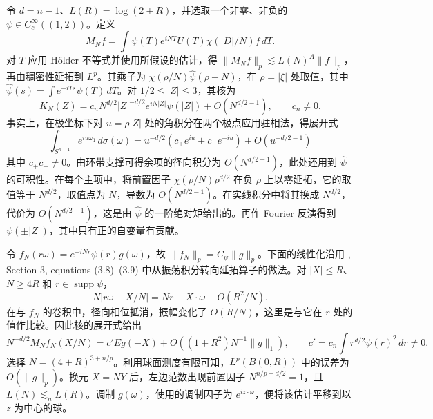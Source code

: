 令 \(d=n-1\)、\(L(R)=\log(2+R)\)，并选取一个非零、非负的 \(\psi\in C_c^\infty((1,2))\)。定义
\[
 M_N f=\int\psi(T)e^{iNT}U(T)\chi(|D|/N)f\,dT .
\]
对 \(T\) 应用 Hölder 不等式并使用所假设的估计，得 \(\|M_N f\|_p\lesssim L(N)^A\|f\|_p\)，再由稠密性延拓到 \(L^p\)。其乘子为 \(\chi(\rho/N)\widehat\psi(\rho-N)\)，在 \(\rho=|\xi|\) 处取值，其中 \(\widehat\psi(s)=\int e^{-iTs}\psi(T)\,dT\)。对 \(1/2\le |Z|\le3\)，其核为
\[
 K_N(Z)=c_n N^{d/2}|Z|^{-d/2}e^{iN|Z|}\psi(|Z|)+O(N^{d/2-1}),\qquad c_n\ne0 .
\]
事实上，在极坐标下对 \(u=\rho|Z|\) 处的角积分在两个极点应用驻相法，得展开式
\[
 \int_{S^{n-1}}e^{iu\omega_1}\,d\sigma(\omega)
   =u^{-d/2}(c_+e^{iu}+c_-e^{-iu})+O(u^{-d/2-1})
\]
其中 \(c_+c_-\ne0\)。由环带支撑可得余项的径向积分为 \(O(N^{d/2-1})\)，此处还用到 \(\widehat\psi\) 的可积性。在每个主项中，将前置因子 \(\chi(\rho/N)\rho^{d/2}\) 在负 \(\rho\) 上以零延拓，它的取值等于 \(N^{d/2}\)，取值点为 \(N\)，导数为 \(O(N^{d/2-1})\)。在实线积分中将其换成 \(N^{d/2}\)，代价为 \(O(N^{d/2-1})\)，这是由 \(\widehat\psi\) 的一阶绝对矩给出的。再作 Fourier 反演得到 \(\psi(\pm|Z|)\)，其中只有正的自变量有贡献。

令 \(f_N(r\omega)=e^{-iNr}\psi(r)g(\omega)\)，故 \(\|f_N\|_p=C_\psi\|g\|_p\)。下面的线性化沿用 \cite{r-38}, Section 3, equations (3.8)--(3.9) 中从振荡积分转向延拓算子的做法。对 \(|X|\le R\)、\(N\ge4R\) 和 \(r\in\operatorname{supp}\psi\)，
\[
 N|r\omega-X/N|=Nr-X\cdot\omega+O(R^2/N).
\]
在与 \(f_N\) 的卷积中，径向相位抵消，振幅变化了 \(O(R/N)\)，这里是与它在 \(r\) 处的值作比较。因此核的展开式给出
\[
 N^{-d/2}M_N f_N(X/N)
  =c' Eg(-X)+O((1+R^2)N^{-1}\|g\|_1),\qquad
 c'=c_n\int r^{d/2}\psi(r)^2\,dr\ne0.
\]
选择 \(N=(4+R)^{3+n/p}\)。利用球面测度有限可知，\(L^p(B(0,R))\) 中的误差为 \(O(\|g\|_p)\)。换元 \(X=NY\) 后，左边范数出现前置因子 \(N^{n/p-d/2}=1\)，且 \(L(N)\lesssim_n L(R)\)。调制 \(g(\omega)\)，使用的调制因子为 \(e^{iz\cdot\omega}\)，便将该估计平移到以 \(z\) 为中心的球。
